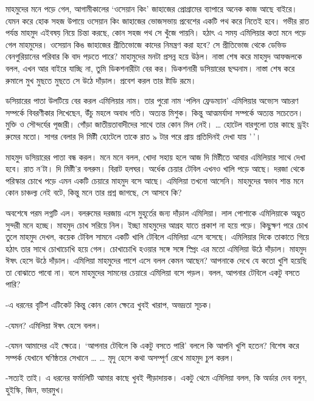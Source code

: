 \documentclass[
]{book}
\begin{document}
মাহমুদের মনে পড়ে গেল, আগামীকালের `ওসেয়ান কিং' জাহাজের প্রোগ্রামের ব্যাপারে অনেক কাজ আছে বাইরে। যেমন করে হোক সহজ উপায়ে ওসেয়ান কিং জাহাজের ভোজসভায় প্রবেশের একটি পথ করে নিতেই হবে। গভীর রাত পর্যন্ত মাহমুদ এইবষয় নিয়ে চিন্তা করছে, কোন সহজ পথ সে খুঁজে পায়নি। হঠাৎ এ সময় এমিলিয়ার কতা মনে পড়ে গেল মাহমুদের। ওসেয়ান কিঙ জাহাজের প্রীতিভোজে কাদের নিমন্ত্রণ করা হবে? সে প্রীতিভোজ থেকে ডেভিড বেনগুরিয়ানের পরিবার কি বাদ পড়তে পারে? মাহামুদের মনটা প্রসন্ন হয়ে উঠল। নাস্তা শেষ করে মাহমুদ আফজলকে বলল, এখন আর বাইরে যাচ্ছি না, তুমি ডিকশনারীটা বের কর। ডিকশনারী ডসিয়ারের ছদ্মনাম। নাস্তা শেষ করে রুমালে মুখ মুছতে মুছতে সে উঠে দাঁড়াল। প্রবেশ করল তার ষ্টাডি রূমে।

ডসিয়ারের পাতা উলটিয়ে বের করল এমিলিয়ার নাম। তার পুরো নাম `পলিন ফ্রেডম্যান' এমিলিয়ার অভ্যেস আচরণ সম্পর্কে বিবরণীকার লিখেছেন, উঁচু মহলে অবাধ গতি। অত্যন্ত মিশুক। কিন্তু আত্মমর্যাদা সম্পর্কে অত্যন্ত সচেতেন। মুক্তি ও সৌন্দর্যের পূজারী। গোঁড়া জাতীয়তাবাদীদের সাথে তার কোন মিল নেই। \ldots{} হোটেল বারগুলো তার কাছে ড্রইং রুমের মতো। সাগর বেলার দি মিষ্টী হোটেলে তাকে রাত ৯ টার পরে প্রায় প্রতিদিনই দেখা যায় '\,'।

মাহমুদ ডসিয়ারের পাতা বন্ধ করল। মনে মনে বলল, খোদা সহায় হলে আজ দি মিষ্টীতে আবার এমিলিয়ার সাথে দেখা হবে। রাত ন'টা। দি মিষ্টী'র বলরুম। বিরাট হলঘর। অর্ধেক চেয়ার টেবিল এখনও খালি পড়ে আছে। দরজা থেকে পরিস্কার চোখে পড়ে এমন একটি চেয়ারে মাহমুদ বসে আছে। এমিলিয়া তখনো আসেনি। মাহমুদের স্বভাব শান্ত মনে কোন চাঞ্চল্য নেই বটে, কিন্তু মনে তার প্রশ্ন জাগছে, সে আসবে কি?

অবশেষে পরম লগ্নটি এল। বলরুমের দরজায় এসে মুহূর্তের জন্য দাঁড়াল এমিলিয়া। লাল পোশাকে এমিলিয়াকে অদ্ভুত সুন্দরী মনে হচ্ছে। মাহমুদ চোখ সরিয়ে নিল। ইচ্ছা মাহমুদের আগ্রহ যাতে প্রকাশ না হয়ে পড়ে। কিছুক্ষণ পরে চোখ তুলে মাহমুদ দেখল, কয়েক টেবিল সামনে একটি খালি টেবিলে এমিলিয়া এসে বসেছে। এমিলিয়ার দিকে তাকাতে গিয়ে হঠাৎ তার সাথে চোখাচোখি হয়ে গেল। চোখাচোখি হওয়ার সঙ্গে সঙ্গে স্প্রিং এর মতো এমিলিয়া উঠে দাঁড়াল। মাহমুদ ঈষৎ হেসে উঠে দাঁড়াল। এমিলিয়া মাহমুদের পাশে এসে বলল কেমন আছেন? আপনাকে দেখে যে কতো খুশি হয়েছি তা বোঝাতে পাবো না। বলে মাহমুদের সামনের চেয়ারে এমিলিয়া বসে পড়ল। বলল, আপনার টেবিলে একটু বসতে পারি?

-এ ধরনের বৃটিশ এটিকেট কিন্তু কোন কোন ক্ষেত্রে খুবই খারাপ, অভদ্রতা সূচক।

-যেমন? এমিলিয়া ঈষৎ হেসে বলল।

-যেমন আমাদের এই ক্ষেত্রে। `আপনার টেবিলে কি একটু বসতে পারি' বললে কি আপনি খুশি হতেন? বিশেষ করে সম্পর্ক যেখানে ঘণিষ্ঠতর সেখানে \ldots{} \ldots{} মৃদু হেসে কথা অসম্পূর্ণ রেখে মাহমুদ চুপ করল।

-সত্যই তাই। এ ধরনের ফর্মালিটি আমার কাছে খুবই পীড়াদায়ক। একটু থেমে এমিলিয়া বলল, কি অর্ডার দেব বলুন, হুইস্কি, জিন, ভারমুখ।
\end{document}
